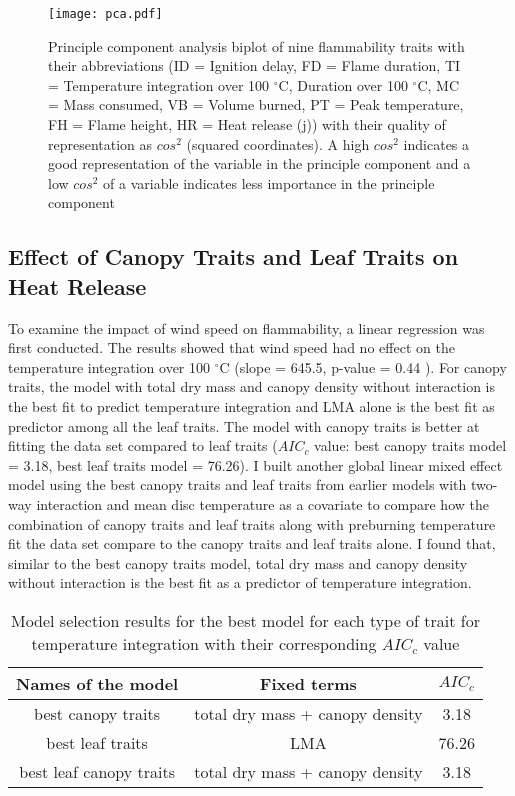 \documentclass[12pt]{report}
\begin{document}
\begin{figure}
    \centering
    \texttt{[image: pca.pdf]}
    \caption{Principle component analysis biplot of nine flammability traits with their abbreviations (ID = Ignition delay, FD = Flame duration, TI = Temperature integration over 100 $^{\circ}$C, Duration over 100 $^{\circ}$C, MC = Mass consumed, VB = Volume burned, PT = Peak temperature, FH = Flame height, HR = Heat release (j)) with their quality of representation as $cos^2$ (squared coordinates). A high $cos^2$ indicates a good representation of the variable in the principle component and a low $cos^2$ of a variable indicates less importance in the principle component}
\end{figure}

\subsection{Effect of Canopy Traits and Leaf Traits on Heat Release}
To examine the impact of wind speed on flammability, a linear regression was first conducted. The results showed that wind speed had no effect on the temperature integration over 100 $^{\circ}$C  (slope = 645.5, p-value = 0.44 ). For canopy traits, the model with total dry mass and canopy density without interaction is the best fit to predict temperature integration and \MakeUppercase{lma} alone is the best fit as predictor among all the leaf traits. The model with canopy traits is better at fitting the data set compared to leaf traits ($AIC_{c}$ value: best canopy traits model = 3.18, best leaf traits model = 76.26). I built another global linear mixed effect model using the best canopy traits and leaf traits from earlier models with two-way interaction and mean disc temperature as a covariate to compare how the combination of canopy traits and leaf traits along with pre\-burning temperature fit the data set compare to the canopy traits and leaf traits alone. I found that, similar to the best canopy traits model, total dry mass and canopy density without interaction is the best fit as a predictor of temperature integration.

\begin{table}
\centering
\begin{tabular}{|c | c | c|}
       \hline
       \textbf{Names of the model} & \textbf{Fixed terms} & \textbf{$AIC_{c}$} \\
       \hline
       best canopy traits & total dry mass + canopy density & 3.18 \\
       \hline
       best leaf traits  & LMA & 76.26 \\
       \hline
       best leaf canopy traits   &total dry mass + canopy density & 3.18\\
       \hline
\end{tabular}
\caption{Model selection results for the best model for each type of trait for temperature integration with their corresponding $AIC_{c}$ value}
\end{table} 
\end{document}
